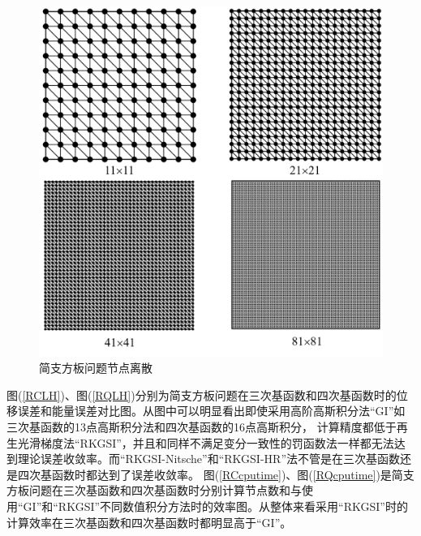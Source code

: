 \begin{figure}[H]
\centering
      \includegraphics[scale=0.5]{figure/PHR/R/rectangularmsh.png}
    \caption{简支方板问题节点离散}\label{rectangularmsh}
\end{figure}
\newpage
 图(\ref{RCLH})、图(\ref{RQLH})分别为简支方板问题在三次基函数和四次基函数时的位移误差和能量误差对比图。从图中可以明显看出即使采用高阶高斯积分法“GI”如三次基函数的13点高斯积分法和四次基函数的16点高斯积分，
计算精度都低于再生光滑梯度法“RKGSI”，并且和同样不满足变分一致性的罚函数法一样都无法达到理论误差收敛率。而“RKGSI-Nitsche”和“RKGSI-HR”法不管是在三次基函数还是四次基函数时都达到了误差收敛率。
图(\ref{RCcputime})、图(\ref{RQcputime})是简支方板问题在三次基函数和四次基函数时分别计算节点数和与使用“GI”和“RKGSI”不同数值积分方法时的效率图。从整体来看采用“RKGSI”时的计算效率在三次基函数和四次基函数时都明显高于“GI”。  
